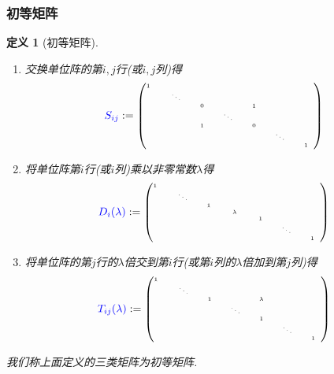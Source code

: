 \documentclass{article}
\newtheorem{definition}[theorem]{定义}
\renewcommand{\blue }[1]{{\textcolor[rgb]{0,0,1}{#1}}}
\begin{document}
\subsubsection{初等矩阵}
\begin{definition}[初等矩阵]
\begin{enumerate}
\item 交换单位阵的第$i,j$行(或$i,j$列)得
\[\tiny \blue{S_{ij}} := \begin{pmatrix}
1\quad&\qquad&\qquad&\qquad&\qquad&\qquad&\qquad\\
&\ddots&      &      &      &      &     \\
&      &  0   &      &  1   &      &     \\
&      &      &\ddots&      &      &     \\
&      &  1   &      &  0   &      &     \\
&      &      &      &      &\ddots&     \\
&      &      &      &      &      &  1  \\
\end{pmatrix}\]
\item 将单位阵第$i$行(或$i$列)乘以非零常数$\lambda$得
\[\tiny \blue{D_i(\lambda)} :=\begin{pmatrix}
1\quad&\qquad&\qquad&\qquad&\qquad&\qquad&\qquad\\
&\ddots&      &       &      &      &     \\
&      &  1   &       &      &      &     \\
&      &      &\lambda&      &      &     \\
&      &      &       &  1   &      &     \\
&      &      &       &      &\ddots&     \\
&      &      &       &      &      &  1  \\
\end{pmatrix}\]
\item 将单位阵的第$j$行的$\lambda$倍交到第$i$行(或第$i$列的$\lambda$倍加到第$j$列)得
\[\tiny \blue{T_{ij}(\lambda)} := \begin{pmatrix}
1\quad&\qquad&\qquad&\qquad&\qquad&\qquad&\qquad\\
&\ddots&      &      &       &      &     \\
&      &  1   &      &\lambda&      &     \\
&      &      &\ddots&       &      &     \\
&      &      &      &  1    &      &     \\
&      &      &      &       &\ddots&     \\
&      &      &      &       &      &  1  \\
\end{pmatrix}\]
\end{enumerate}
我们称上面定义的三类矩阵为\blue{初等矩阵}.
\end{definition}
\end{document}
